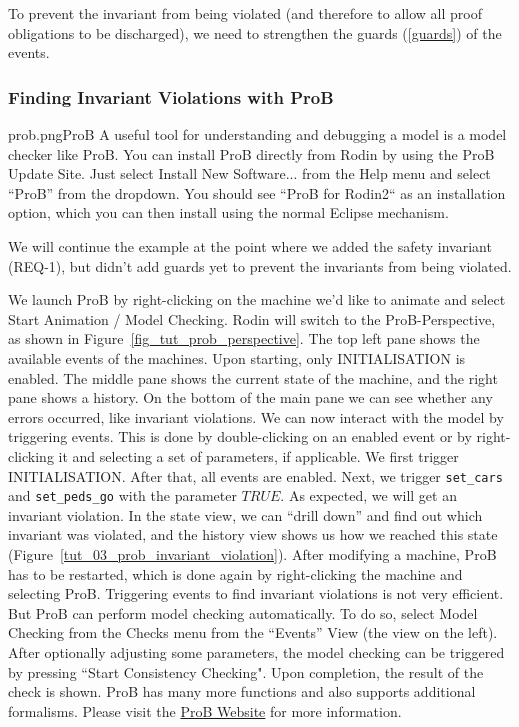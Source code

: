 To prevent the invariant from being violated (and therefore to allow all proof obligations to be discharged), we need to strengthen the guards (\ref{guards}) of the events.


\subsubsection{Finding Invariant Violations with ProB}
\label{tut:prob}
\begin{rodin-plugin}{prob.png}{ProB}
A useful tool for understanding and debugging a model is a model checker like ProB. You can install ProB directly from Rodin by using the ProB Update Site.  Just select \textsf{Install New Software...} from the \textsf{Help} menu and select ``ProB'' from the dropdown. You should see ``ProB for Rodin2`` as an installation option, which you can then install using the normal Eclipse mechanism. 

We will continue the example at the point where we added the safety invariant (REQ-1), but didn't add guards yet to prevent the invariants from being violated.

We launch ProB by right-clicking on the machine we'd like to animate and select \textsf{Start Animation / Model Checking}.  Rodin will switch to the ProB-Perspective, as shown in Figure~\ref{fig_tut_prob_perspective}. The top left pane shows the available events of the machines.  Upon starting, only INITIALISATION is enabled.  The middle pane shows the current state of the machine, and the right pane shows a history.  On the bottom of the main pane we can see whether any errors occurred, like invariant violations. We can now interact with the model by triggering events.  This is done by double-clicking on an enabled event or by right-clicking it and selecting a set of parameters, if applicable.  We first trigger INITIALISATION.  After that, all events are enabled.  Next, we trigger \texttt{set\_cars} and \texttt{set\_peds\_go}  with the parameter $TRUE$.  As expected, we will get an invariant violation.  In the state view, we can ``drill down'' and find out which invariant was violated, and the history view shows us how we reached this state (Figure~\ref{tut_03_prob_invariant_violation}). After modifying a machine, ProB has to be restarted, which is done again by right-clicking the machine and selecting ProB.  Triggering events to find invariant violations is not very efficient.  But ProB can perform model checking automatically.  To do so, select \textsf{Model Checking} from the \textsf{Checks} menu from the ``Events'' View (the view on the left).  After optionally adjusting some parameters, the model checking can be triggered by pressing ``Start Consistency Checking".  Upon completion, the result of the check is shown. ProB has many more functions and also supports additional formalisms. Please visit the \href{http://www.stups.uni-duesseldorf.de/ProB}{ProB Website} for more information.

\end{rodin-plugin}


